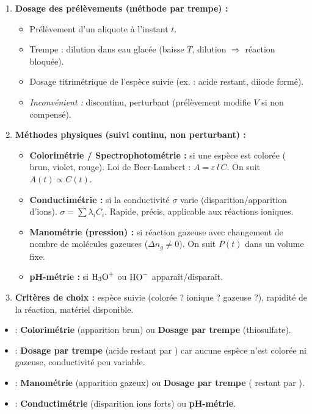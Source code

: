 \documentclass[11pt]{article}
\newcommand{\cle}[1]{{\popxbold\color{popdark}#1}}
\begin{document}
\begin{methode}
\begin{enumerate}
\item \textbf{Dosage des prélèvements (méthode par trempe) :}
      \begin{itemize}
      \item Prélèvement d'un aliquote à l'instant $t$.
      \item \cle{Trempe} : dilution dans eau glacée (baisse $T$, dilution $\Rightarrow$ réaction bloquée).
      \item Dosage titrimétrique de l'espèce suivie (ex. : acide restant, diiode formé).
      \item \emph{Inconvénient :} discontinu, perturbant (prélèvement modifie $V$ si non compensé).
      \end{itemize}
\item \textbf{Méthodes physiques (suivi continu, non perturbant) :}
      \begin{itemize}
      \item \textbf{Colorimétrie / Spectrophotométrie :} si une espèce est colorée ( brun,  violet,  rouge). Loi de Beer-Lambert : $A = \varepsilon\, l\, C$. On suit $A(t) \propto C(t)$.
      \item \textbf{Conductimétrie :} si la conductivité $\sigma$ varie (disparition/apparition d'ions). $\sigma = \sum \lambda_i C_i$. Rapide, précis, applicable aux réactions ioniques.
      \item \textbf{Manométrie (pression) :} si réaction gazeuse avec changement de nombre de molécules gazeuses ($\Delta n_g \neq 0$). On suit $P(t)$ dans un volume fixe.
      \item \textbf{pH-métrie :} si $\ce{H3O+}$ ou $\ce{HO-}$ apparaît/disparaît.
      \end{itemize}
\item \textbf{Critères de choix :} espèce suivie (colorée ? ionique ? gazeuse ?), rapidité de la réaction, matériel disponible.
\end{enumerate}
\end{methode}

\begin{exemplebox}
\begin{itemize}
\item {} : \textbf{Colorimétrie} (apparition  brun) ou \textbf{Dosage par trempe} (thiosulfate).
\item {} : \textbf{Dosage par trempe} (acide restant par ) car aucune espèce n'est colorée ni gazeuse, conductivité peu variable.
\item {} : \textbf{Manométrie} (apparition  gazeux) ou \textbf{Dosage par trempe} ( restant par ).
\item {} : \textbf{Conductimétrie} (disparition ions forts) ou \textbf{pH-métrie}.
\end{itemize}
\end{exemplebox}
\end{document}
